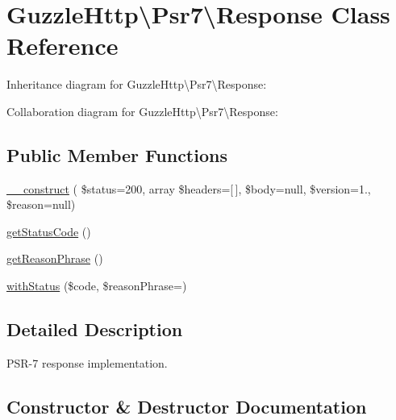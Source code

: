\hypertarget{classGuzzleHttp_1_1Psr7_1_1Response}{}\section{Guzzle\+Http\textbackslash{}Psr7\textbackslash{}Response Class Reference}
\label{classGuzzleHttp_1_1Psr7_1_1Response}


Inheritance diagram for Guzzle\+Http\textbackslash{}Psr7\textbackslash{}Response\+:


Collaboration diagram for Guzzle\+Http\textbackslash{}Psr7\textbackslash{}Response\+:
\subsection*{Public Member Functions}
\begin{DoxyCompactItemize}
\item 
\hyperlink{classGuzzleHttp_1_1Psr7_1_1Response_a79ee107513483b3de6e41badc7c7fea8}{\+\_\+\+\_\+construct} ( \$status=200, array \$headers=\mbox{[}$\,$\mbox{]}, \$body=null, \$version=\textquotesingle{}1.\textquotesingle{}, \$reason=null)
\item 
\hyperlink{classGuzzleHttp_1_1Psr7_1_1Response_af62648e0dfc88b9100d82c188337882a}{get\+Status\+Code} ()
\item 
\hyperlink{classGuzzleHttp_1_1Psr7_1_1Response_a7a7ba26406b18f2353cef4a639fe4be6}{get\+Reason\+Phrase} ()
\item 
\hyperlink{classGuzzleHttp_1_1Psr7_1_1Response_ac436d34fd685d7a4ddfe5931ecd58538}{with\+Status} (\$code, \$reason\+Phrase=\textquotesingle{}\textquotesingle{})
\end{DoxyCompactItemize}


\subsection{Detailed Description}
P\+S\+R-\/7 response implementation. 

\subsection{Constructor \& Destructor Documentation}
\mbox{\label{classGuzzleHttp_1_1Psr7_1_1Response_a79ee107513483b3de6e41badc7c7fea8}} 
